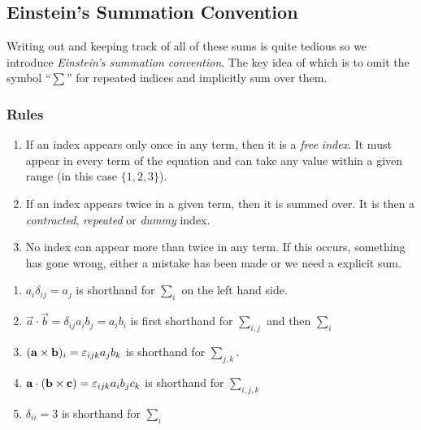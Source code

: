 \documentclass[../main.tex]{subfiles}
\begin{document}
\subsection{Einstein's Summation Convention}
Writing out and keeping track of all of these sums is quite tedious so we introduce \textit{Einstein's summation convention}.
The key idea of which is to omit the symbol ``$\sum$'' for repeated indices and implicitly sum over them.
\subsubsection{Rules}
\begin{enumerate}
  \item If an index appears only once in any term, then it is a \textit{free index}.
    It must appear in every term of the equation and can take any value within a given range (in this case $\{1, 2, 3\}$).
  \item If an index appears twice in a given term, then it is summed over. It is then a \textit{contracted}, \textit{repeated} or \textit{dummy} index.
  \item No index can appear more than twice in any term.
    If this occurs, something has gone wrong, either a mistake has been made or we need a explicit sum.
\end{enumerate}
\begin{example}
  \begin{enumerate}
    \item $a_i \delta_{i j} = a_j$ is shorthand for $\sum_{i}$ on the left hand side.
    \item $\vec{a} \cdot \vec{b} = \delta_{i j} a_i b_j = a_i b_i$ is first shorthand for $\sum_{i,j}$ and then $\sum_{i}$
    \item $(\mathbf{\bm{a}} \times \mathbf{\bm{b}})_i = \varepsilon_{ijk} a_j b_k$ is shorthand for $\sum_{j,k}$.
    \item $\mathbf{\bm{a}} \cdot (\mathbf{\bm{b}} \times \mathbf{\bm{c}}) = \varepsilon_{ijk} a_i b_j c_k$ is shorthand for $\sum_{i,j,k}$
    \item $\delta_{i i} = 3$ is shorthand for $\sum_{i}$
  \end{enumerate}
\end{example}
\end{document}
